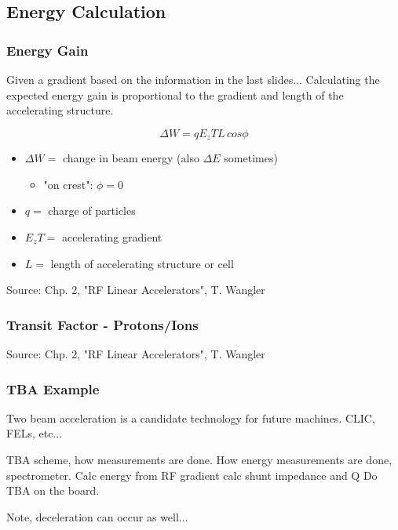 \documentclass[professionalfonts,t]{beamer}
\begin{document}
\subsection{Energy Calculation}
\begin{frame}
\frametitle{Energy Gain}
Given a gradient based on the information in the last slides...
Calculating the expected energy gain is proportional to the gradient and length of the accelerating structure. 

\begin{equation}
	\Delta W = qE_zTL\, cos\phi
\end{equation}

\begin{itemize}
	\item $\Delta W = $ change in beam energy (also $\Delta E$ sometimes)
	\begin{itemize}
		\item "on crest": $ \phi=0$
	\end{itemize}
	\item $q =$ charge of particles
	\item $E_zT = $ accelerating gradient
	\item $L = $ length of accelerating structure or cell 
\end{itemize}

\vspace{0.25em}
Source: Chp. 2, "RF Linear Accelerators", T. Wangler
\end{frame}


\begin{frame}
\frametitle{Transit Factor - Protons/Ions}

\vspace{1em}
Source: Chp. 2, "RF Linear Accelerators", T. Wangler
\end{frame}

\begin{frame}
	\frametitle{TBA Example}

	
	Two beam acceleration is a candidate technology for future machines.
	CLIC, FELs, etc...
	
	TBA scheme, how measurements are done. 
How energy measurements are done, spectrometer.
Calc energy from RF gradient
calc shunt impedance and Q
Do TBA on the board.	

	Note, deceleration can occur as well...
	
\end{frame}
\end{document}
